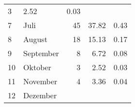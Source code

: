\begin{longtable}{lXrrr}
       \num{3} &
       \num[round-mode=places,round-precision=2]{2.52} &
         \num[round-mode=places,round-precision=2]{0.03} \\

     7 &
     \multicolumn{1}{X}{ Juli   } &


       \num{45} &
       \num[round-mode=places,round-precision=2]{37.82} &
         \num[round-mode=places,round-precision=2]{0.43} \\

     8 &
     \multicolumn{1}{X}{ August   } &


       \num{18} &
       \num[round-mode=places,round-precision=2]{15.13} &
         \num[round-mode=places,round-precision=2]{0.17} \\

     9 &
     \multicolumn{1}{X}{ September   } &


       \num{8} &
       \num[round-mode=places,round-precision=2]{6.72} &
         \num[round-mode=places,round-precision=2]{0.08} \\

     10 &
     \multicolumn{1}{X}{ Oktober   } &


       \num{3} &
       \num[round-mode=places,round-precision=2]{2.52} &
         \num[round-mode=places,round-precision=2]{0.03} \\

     11 &
     \multicolumn{1}{X}{ November   } &


       \num{4} &
       \num[round-mode=places,round-precision=2]{3.36} &
         \num[round-mode=places,round-precision=2]{0.04} \\

     12 &
     \multicolumn{1}{X}{ Dezember   } &



\end{longtable}
